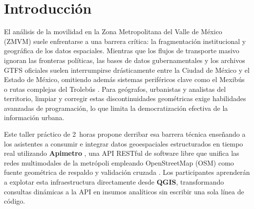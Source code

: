 
\section{Introducción}

El análisis de la movilidad en la Zona Metropolitana del Valle de México (ZMVM)
suele enfrentarse a una barrera crítica: la fragmentación institucional y
geográfica de los datos espaciales.  Mientras que los flujos de transporte masivo
ignoran las fronteras políticas, las bases de datos gubernamentales y los archivos
GTFS oficiales suelen interrumpirse drásticamente entre la Ciudad de México y el
Estado de México, omitiendo además sistemas periféricos clave como el Mexibús o
rutas complejas del Trolebús \citep{semovi2020diagnostico}.  Para geógrafos,
urbanistas y analistas del territorio, limpiar y corregir estas discontinuidades
geométricas exige habilidades avanzadas de programación, lo que limita la
democratización efectiva de la información urbana.

Este taller práctico de 2~horas propone derribar esa barrera técnica enseñando a
los asistentes a consumir e integrar datos geoespaciales estructurados en tiempo
real utilizando \textbf{Apimetro} \citep{garibaldi2025apimetro}, una API RESTful
de software libre que unifica las redes multimodales de la metrópoli empleando
OpenStreetMap (OSM) como fuente geométrica de respaldo y validación cruzada
\citep{haklay2010good}.  Los participantes aprenderán a explotar esta
infraestructura directamente desde \textbf{QGIS}, transformando consultas
dinámicas a la API en insumos analíticos sin escribir una sola línea de código.
